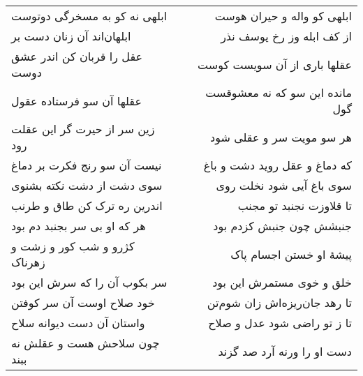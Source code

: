 \begin{center}
\begin{longtable}{l p{0.5cm} r}
ابلهی نه کو به مسخرگی دوتوست
&&
ابلهی کو واله و حیران هوست
\\
ابلهان‌اند آن زنان دست بر
&&
از کف ابله وز رخ یوسف نذر
\\
عقل را قربان کن اندر عشق دوست
&&
عقلها باری از آن سویست کوست
\\
عقلها آن سو فرستاده عقول
&&
مانده این سو که نه معشوقست گول
\\
زین سر از حیرت گر این عقلت رود
&&
هر سو مویت سر و عقلی شود
\\
نیست آن سو رنج فکرت بر دماغ
&&
که دماغ و عقل روید دشت و باغ
\\
سوی دشت از دشت نکته بشنوی
&&
سوی باغ آیی شود نخلت روی
\\
اندرین ره ترک کن طاق و طرنب
&&
تا قلاوزت نجنبد تو مجنب
\\
هر که او بی سر بجنبد دم بود
&&
جنبشش چون جنبش کزدم بود
\\
کژرو و شب کور و زشت و زهرناک
&&
پیشهٔ او خستن اجسام پاک
\\
سر بکوب آن را که سرش این بود
&&
خلق و خوی مستمرش این بود
\\
خود صلاح اوست آن سر کوفتن
&&
تا رهد جان‌ریزه‌اش زان شوم‌تن
\\
واستان آن دست دیوانه سلاح
&&
تا ز تو راضی شود عدل و صلاح
\\
چون سلاحش هست و عقلش نه ببند
&&
دست او را ورنه آرد صد گزند
\\
\end{longtable}
\end{center}
